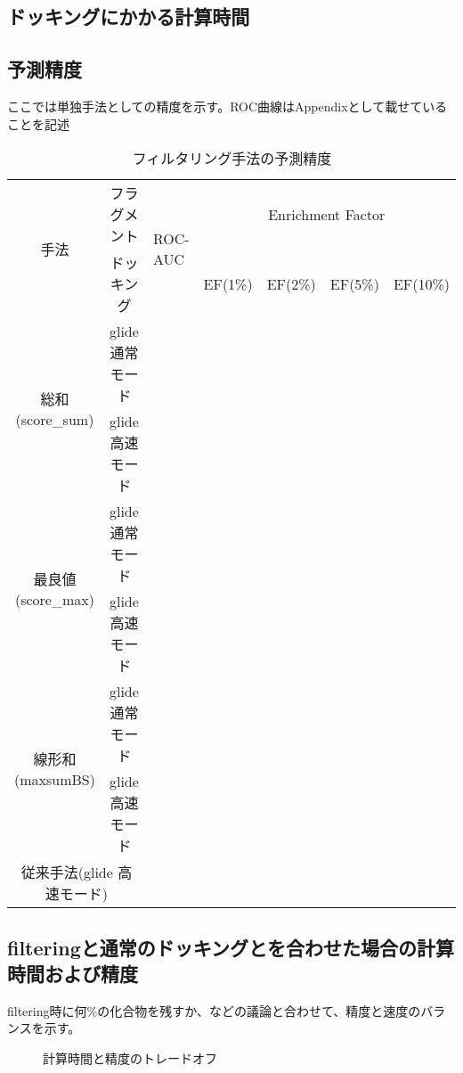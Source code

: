 \subsection{ドッキングにかかる計算時間}
\subsection{予測精度}
ここでは単独手法としての精度を示す。ROC曲線はAppendixとして載せていることを記述

\begin{table}[htb] \centering
	\caption{フィルタリング手法の予測精度}
	\label{tb:filtering_accuracy}
	\begin{tabular}{c|c|lllll|}
	\multirow{2}{*}{手法}				&フラグメント		&\multirow{2}{*}{ROC-AUC}	&\multicolumn{4}{c}{Enrichment Factor}	\\
									&ドッキング		&						&EF(1\%)	&EF(2\%)	&EF(5\%)	&EF(10\%)	\\ \hline
	\multirow{2}{*}{総和(score\_sum)}		&glide 通常モード	&						&		&		&		&			\\
									&glide 高速モード	&						&		&		&		&			\\
	\multirow{2}{*}{最良値(score\_max)}	&glide 通常モード	&						&		&		&		&			\\
									&glide 高速モード	&						&		&		&		&			\\
	\multirow{2}{*}{線形和(maxsumBS)}	&glide 通常モード	&						&		&		&		&			\\
									&glide 高速モード	&						&		&		&		&			\\ \hline
	\multicolumn{2}{c|}{従来手法(glide 高速モード)}			&						&		&		&		&			\\ \hline
	\end{tabular}
\end{table}

\subsection{filteringと通常のドッキングとを合わせた場合の計算時間および精度}
filtering時に何\%の化合物を残すか、などの議論と合わせて、精度と速度のバランスを示す。
\begin{figure}[htp]
 \begin{center}
  \caption{計算時間と精度のトレードオフ}
  \label{fig:trade_off}
 \end{center}
\end{figure}
